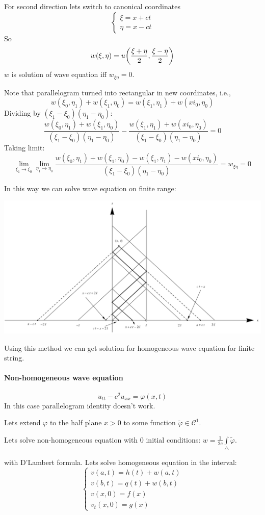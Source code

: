 For second direction lets switch to canonical coordinates
$$\begin{cases}
\xi = x+ct\\
\eta = x-ct
\end{cases}$$
So
$$w(\xi, \eta) = u\qty(\frac{\xi+\eta}{2} ,\frac{\xi-\eta}{2})$$
$w$ is solution of wave equation iff $w_{\xi \eta} = 0$. 

Note that parallelogram turned into rectangular in new coordinates, i.e.,
$$w(\xi_0, \eta_1) + w(\xi_1, \eta_0) = w(\xi_1, \eta_1) + w(xi_0, \eta_0)$$
Dividing by $(\xi_1-\xi_0)(\eta_1-\eta_0)$:
$$\frac{w(\xi_0, \eta_1) + w(\xi_1, \eta_0) }{(\xi_1-\xi_0)(\eta_1-\eta_0)} - \frac{w(\xi_1, \eta_1) + w(xi_0, \eta_0)}{(\xi_1-\xi_0)(\eta_1-\eta_0)} = 0$$
Taking limit:
$$\lim_{\xi_1\to \xi_0} \lim_{\eta_1\to \eta_0} \frac{w(\xi_0, \eta_1) + w(\xi_1, \eta_0) - w(\xi_1, \eta_1) -  w(xi_0, \eta_0)}{(\xi_1-\xi_0)(\eta_1-\eta_0)} = w_{\xi\eta} = 0$$


In this way we can solve wave equation on finite range:
\begin{center}
	\includegraphics[width=\linewidth]{./lect4/pic2.png}
\end{center}
Using this method we can get solution for homogeneous wave equation for finite string.
\paragraph{Non-homogeneous wave equation}
$$u_{tt} -c^2u_{xx} = \varphi(x,t)$$
In this case parallelogram identity doesn't work. 

Lets extend $\varphi$ to the half plane $x>0$ to some function $\tilde{\varphi} \in \mathcal{C}^1$.


Lets solve non-homogeneous equation with 0  initial conditions:
 $w= \frac{1}{2c}\int\limits_{\triangle} \tilde{\varphi}$.


 with D'Lambert formula. 
 Lets solve homogeneous equation in the interval:
 $$\begin{cases}
 v(a,t) = h(t) + w(a,t)\\
 v(b,t) = q(t)+ w(b,t)\\
 v(x,0) = f(x)\\
 v_t(x,0) = g(x)
 \end{cases}$$
 
